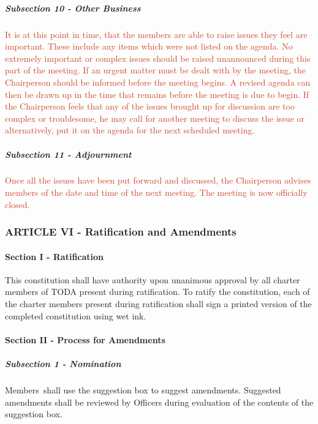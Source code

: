 \documentclass[12pt]{report}
\begin{document}
\subparagraph{Subsection 10 - Other Business}
\textcolor[HTML]{CC4125}{It is at this point in time, that the members are able to raise issues they feel are important. These include any items which were not listed on the agenda. No extremely important or complex issues should be raised unannounced during this part of the meeting. If an urgent matter must be dealt with by the meeting, the Chairperson should be informed before the meeting begins. A revised agenda can then be drawn up in the time that remains before the meeting is due to begin. If the Chairperson feels that any of the issues brought up for discussion are too complex or troublesome, he may call for another meeting to discuss the issue or alternatively, put it on the agenda for the next scheduled meeting.}\par

\subparagraph{Subsection 11 - Adjournment}
\textcolor[HTML]{CC4125}{Once all the issues have been put forward and discussed, the Chairperson advises members of the date and time of the next meeting. The meeting is now officially closed.}\par

\subsubsection*{ARTICLE VI - Ratification and Amendments}
\paragraph*{Section I - Ratification}
This constitution shall have authority upon unanimous approval by all charter members of TODA present during ratification. To ratify the constitution, each of the charter members present during ratification shall sign a printed version of the completed constitution using wet ink.\par

\paragraph*{Section II - Process for Amendments}
\subparagraph{Subsection 1 - Nomination}
Members\ shall use the suggestion box to suggest amendments.  Suggested amendments shall be reviewed by Officers during evaluation of the contents of the suggestion box.\par
\end{document}
